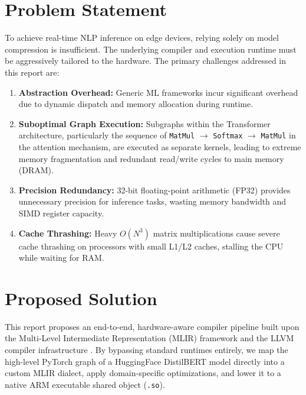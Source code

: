 \section{Problem Statement}
To achieve real-time NLP inference on edge devices, relying solely on model compression is insufficient. The underlying compiler and execution runtime must be aggressively tailored to the hardware. The primary challenges addressed in this report are:
\begin{enumerate}
    \item \textbf{Abstraction Overhead:} Generic ML frameworks incur significant overhead due to dynamic dispatch and memory allocation during runtime.
    \item \textbf{Suboptimal Graph Execution:} Subgraphs within the Transformer architecture, particularly the sequence of \texttt{MatMul} $\rightarrow$ \texttt{Softmax} $\rightarrow$ \texttt{MatMul} in the attention mechanism, are executed as separate kernels, leading to extreme memory fragmentation and redundant read/write cycles to main memory (DRAM).
    \item \textbf{Precision Redundancy:} 32-bit floating-point arithmetic (FP32) provides unnecessary precision for inference tasks, wasting memory bandwidth and SIMD register capacity.
    \item \textbf{Cache Thrashing:} Heavy $O(N^3)$ matrix multiplications cause severe cache thrashing on processors with small L1/L2 caches, stalling the CPU while waiting for RAM.
\end{enumerate}

\section{Proposed Solution}
This report proposes an end-to-end, hardware-aware compiler pipeline built upon the Multi-Level Intermediate Representation (MLIR) framework \cite{lattner2020mlir} and the LLVM compiler infrastructure \cite{lattner2004llvm}. By bypassing standard runtimes entirely, we map the high-level PyTorch graph of a HuggingFace DistilBERT model directly into a custom MLIR dialect, apply domain-specific optimizations, and lower it to a native ARM executable shared object (\texttt{.so}).

